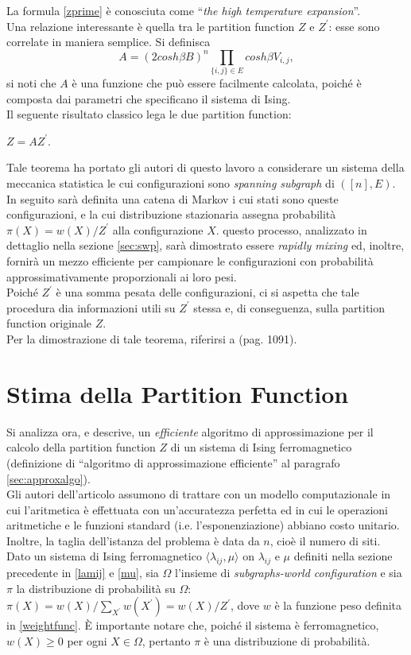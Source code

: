 La formula \ref{zprime} è conosciuta come ``\textit{the high temperature expansion}''.\\
Una relazione interessante è quella tra le partition function $Z$ e $Z^\prime$: esse sono correlate in maniera semplice. Si definisca
\begin{equation}
	A = (2cosh\beta B)^{n} \prod_{\{i,j\}\in E}{cosh\beta V_{i,j}},
	\label{funca}
\end{equation}
si noti che $A$ è una funzione che può essere facilmente calcolata, poiché è composta dai parametri che specificano il sistema di Ising.\\
Il seguente risultato classico \cite{newell1953theory} lega le due partition function:
\begin{thm}
	$Z = AZ^\prime$.
	\label{thm:zaz}
\end{thm}
Tale teorema ha portato gli autori di questo lavoro a considerare un sistema della meccanica statistica le cui configurazioni sono \textit{spanning subgraph} di $([n], E)$. In seguito sarà definita una catena di Markov i cui stati sono queste configurazioni, e la cui distribuzione stazionaria assegna probabilità $\pi(X) = w(X)/Z^\prime$ alla configurazione $X$. questo processo, analizzato in dettaglio nella sezione \ref{sec:swp}, sarà dimostrato essere \textit{rapidly mixing} ed, inoltre, fornirà un mezzo efficiente per campionare le configurazioni con probabilità approssimativamente proporzionali ai loro pesi.\\
Poiché $Z^\prime$ è una somma pesata delle configurazioni, ci si aspetta che tale procedura dia informazioni utili su $Z^\prime$ stessa e, di conseguenza, sulla partition function originale $Z$.\\
Per la dimostrazione di tale teorema, riferirsi a \cite{jerrum1993polynomial} (pag. 1091).
\section{Stima della Partition Function}\label{sec:pf}
Si analizza ora, e descrive, un \textit{efficiente} algoritmo di approssimazione per il calcolo della partition function $Z$ di un sistema di Ising ferromagnetico (definizione di ``algoritmo di approssimazione efficiente'' al paragrafo \ref{sec:approxalgo}).\\
Gli autori dell'articolo assumono di trattare con un modello computazionale in cui l'aritmetica è effettuata con un'accuratezza perfetta ed in cui le operazioni aritmetiche e le funzioni standard (i.e. l'esponenziazione) abbiano costo unitario. Inoltre, la taglia dell'istanza del problema è data da $n$, cioè il numero di siti.\\
Dato un sistema di Ising ferromagnetico $\langle\lambda_{ij}, \mu\rangle$  on $\lambda_{ij}$ e $\mu$ definiti nella sezione precedente in \ref{lamij} e \ref{mu}, sia $\Omega$ l'insieme di \textit{subgraphs-world configuration} e sia $\pi$ la distribuzione di probabilità su $\Omega$: $\pi(X) = w(X)/\sum_{X^{\prime}}{w(X^{\prime})} = w(X)/Z^{\prime}$, dove $w$ è la funzione peso definita in \ref{weightfunc}.
È importante notare che, poiché il sistema è ferromagnetico, $w(X) \geq 0$ per ogni $X \in \Omega$, pertanto $\pi$ è una distribuzione di probabilità.
